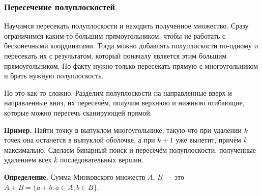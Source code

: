 \subsubsection{Пересечение полуплоскостей}
Научимся пересекать полуплоскости и находить полученное множество.
Сразу ограничимся каким-то большим прямоугольником, чтобы не работать с бесконечными координатами.
Тогда можно добавлять полуплоскости по-одному и пересекать их с результатом, который поначалу является этим большим прямоугольником.
По факту нужно только пересекать прямую с многоугольником и брать нужную полуплоскость.

Но это как-то сложно.
Разделим полуплоскости на направленные вверх и направленные вниз, их пересечём, получим верхнюю и нижнюю огибающие, которые можно пересечь сканирующей прямой.

\textbf{Пример.} Найти точку в выпуклом многоугольнике, такую что при удалении $k$ точек она останется в выпуклой оболочке, а при $k + 1$ уже вылетит, причём $k$ максимально.
Сделаем бинарный поиск и пересечём полуплоскости, полученные удалением всех $k$ последовательных вершин.

\textbf{Определение.} Сумма Минковского множеств $A$, $B$ --- это $A + B = \{a + b: a \in A, b \in B\}$.
